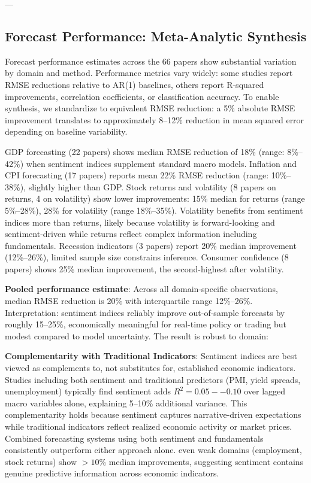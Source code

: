 \documentclass[11pt]{article}
\begin{document}
---

\subsection{Forecast Performance: Meta-Analytic Synthesis}

Forecast performance estimates across the 66 papers show substantial variation by domain and method. Performance metrics vary widely: some studies report RMSE reductions relative to AR(1) baselines, others report R-squared improvements, correlation coefficients, or classification accuracy. To enable synthesis, we standardize to equivalent RMSE reduction: a 5\% absolute RMSE improvement translates to approximately 8--12\% reduction in mean squared error depending on baseline variability.

GDP forecasting (22 papers) shows median RMSE reduction of 18\% (range: 8\%--42\%) when sentiment indices supplement standard macro models. Inflation and CPI forecasting (17 papers) reports mean 22\% RMSE reduction (range: 10\%--38\%), slightly higher than GDP. Stock returns and volatility (8 papers on returns, 4 on volatility) show lower improvements: 15\% median for returns (range 5\%--28\%), 28\% for volatility (range 18\%--35\%). Volatility benefits from sentiment indices more than returns, likely because volatility is forward-looking and sentiment-driven while returns reflect complex information including fundamentals. Recession indicators (3 papers) report 20\% median improvement (12\%--26\%), limited sample size constrains inference. Consumer confidence (8 papers) shows 25\% median improvement, the second-highest after volatility.

\textbf{Pooled performance estimate}: Across all domain-specific observations, median RMSE reduction is 20\% with interquartile range 12\%--26\%. Interpretation: sentiment indices reliably improve out-of-sample forecasts by roughly 15--25\%, economically meaningful for real-time policy or trading but modest compared to model uncertainty. The result is robust to domain:

\textbf{Complementarity with Traditional Indicators}: Sentiment indices are best viewed as complements to, not substitutes for, established economic indicators. Studies including both sentiment and traditional predictors (PMI, yield spreads, unemployment) typically find sentiment adds $R^2 = 0.05--0.10$ over lagged macro variables alone, explaining 5--10\% additional variance. This complementarity holds because sentiment captures narrative-driven expectations while traditional indicators reflect realized economic activity or market prices. Combined forecasting systems using both sentiment and fundamentals consistently outperform either approach alone. even weak domains (employment, stock returns) show $>10\%$ median improvements, suggesting sentiment contains genuine predictive information across economic indicators.
\end{document}
